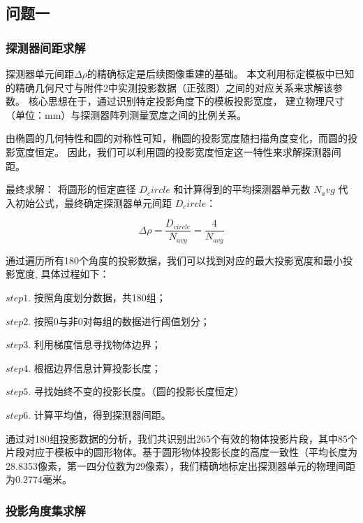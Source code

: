 \subsection{问题一}
\subsubsection{探测器间距求解}

探测器单元间距$\Delta\rho$的精确标定是后续图像重建的基础。
本文利用标定模板中已知的精确几何尺寸与附件2中实测投影数据（正弦图）之间的对应关系来求解该参数。
核心思想在于，通过识别特定投影角度下的模板投影宽度，
建立物理尺寸（单位：mm）与探测器阵列测量宽度之间的比例关系。\par


由椭圆的几何特性和圆的对称性可知，椭圆的投影宽度随扫描角度变化，而圆的投影宽度恒定。
因此，我们可以利用圆的投影宽度恒定这一特性来求解探测器间距。\par


最终求解：
将圆形的恒定直径 $D_circle$ 和计算得到的平均探测器单元数 $N_avg$ 代入初始公式，最终确定探测器单元间距 $D_circle$：

$$\Delta\rho = \frac{D_{circle}}{N_{avg}} = \frac{4}{N_{avg}}$$

通过遍历所有180个角度的投影数据，我们可以找到对应的最大投影宽度和最小投影宽度,
具体过程如下：\par
$step1.$ 按照角度划分数据，共180组；\par
$step2.$ 按照0与非0对每组的数据进行阈值划分；\par
$step3.$ 利用梯度信息寻找物体边界；\par
$step4.$ 根据边界信息计算投影长度；\par
$step5.$ 寻找始终不变的投影长度。（圆的投影长度恒定）\par
$step6.$ 计算平均值，得到探测器间距。

通过对180组投影数据的分析，我们共识别出265个有效的物体投影片段，其中85个片段对应于模板中的圆形物体。基于圆形物体投影长度的高度一致性（平均长度为28.8353像素，第一四分位数为29像素），我们精确地标定出探测器单元的物理间距为0.2774毫米。


\subsubsection{投影角度集求解}

